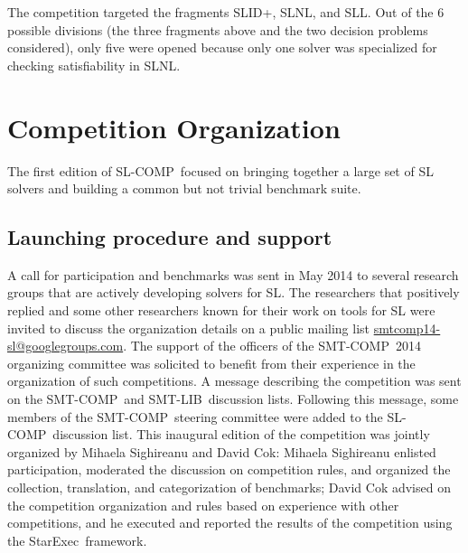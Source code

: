\documentclass[twoside,11pt]{article}
\newcommand{\SLRD}{\textsc{SLID}}
\newcommand{\SLNL}{\textsc{SLNL}}
\newcommand{\SLL}{\textsc{SLL}}
\newcommand{\smtlib}{\textsf{SMT-LIB}}
\newcommand{\smtcomp}{\textsf{SMT-COMP}}
\newcommand{\slcomp}{\textsf{SL-COMP}}
\newcommand{\starexec}{\textsf{StarExec}}
\begin{document}
\noindent
The competition targeted the fragments \SLRD+, \SLNL, and \SLL. 
Out of the 6 possible divisions (the three fragments above and the two decision problems considered), only five were opened because only one solver was specialized for checking satisfiability in \SLNL.


\section{Competition Organization}

The first edition of \slcomp\ focused on %
bringing together a large set of SL solvers and
building a common but not trivial benchmark suite. 

\subsection{Launching procedure and support}
A call for participation and benchmarks was sent
in May 2014 %
to several research groups 
that are actively developing solvers for SL.
The researchers that positively replied and some other researchers known for their work on tools for SL were invited to discuss the organization details on a public mailing list \url{smtcomp14-sl@googlegroups.com}.
The support of the officers of the \smtcomp\ 2014 organizing committee was solicited to benefit from their experience in the organization of such competitions.
%
A message describing the competition was sent on the \smtcomp\ and \smtlib\ discussion lists. Following this message, some members of the \smtcomp\ steering committee were added to the \slcomp\ discussion list. 
This inaugural edition of the competition was jointly organized by Mihaela Sighireanu and David Cok:
Mihaela Sighireanu enlisted participation, moderated the discussion on competition rules, and organized the 
collection, translation, and categorization of benchmarks; 
David Cok advised on the competition organization and rules based on experience with other competitions, and he executed and reported the results of the competition using the \starexec\ framework.
\end{document}
